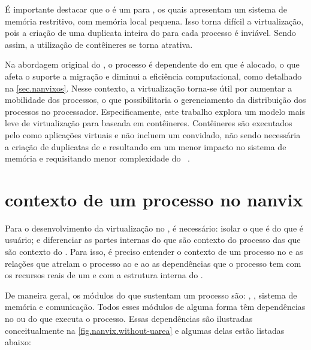 É importante destacar que o \nanvix é um \so para \lws, os quais apresentam um sistema de memória restritivo, com memória local pequena. Isso torna difícil a virtualização, pois a criação de uma duplicata inteira do \so para cada processo é inviável. Sendo assim, a utilização de contêineres se torna atrativa. 

Na abordagem original do \nanvix, o processo é dependente do \cluster em que é alocado, o que afeta o suporte a migração e diminui a eficiência computacional, como detalhado na \autoref{sec.nanvixos}. Nesse contexto, a virtualização torna-se útil por aumentar a mobilidade dos processos, o que possibilitaria o gerenciamento da distribuição dos processos no processador. Especificamente, este trabalho explora um modelo mais leve de virtualização para \lws baseada em contêineres. Contêineres são executados pelo \os como aplicações virtuais e não incluem um \os convidado, não sendo necessária a criação de duplicatas de \sos e resultando em um menor impacto no sistema de memória e requisitando menor complexidade do \hardware~\cite{thalheim2018cntr, sharma2016containers, zhang2018comparative}.

\section{contexto de um processo no nanvix}

Para o desenvolvimento da virtualização no \nanvix, é necessário: isolar o que é  do que é usuário; e diferenciar as partes internas do  que são contexto do processo das que são contexto do \cluster. Para isso, é preciso entender o contexto de um processo no \nanvix e as relações que atrelam o processo ao \cluster e ao \so \ie as dependências que o processo tem com os recursos reais de um \cluster e com a estrutura interna do \so. 

De maneira geral, os módulos do \nanvix que sustentam um processo são: \threads, \syscalls, sistema de memória e comunicação. Todos esses módulos de alguma forma têm dependências no  ou \hardware do \cluster que executa o processo. Essas dependências são ilustradas conceitualmente na \autoref{fig.nanvix.without-uarea} e algumas delas estão listadas abaixo:

